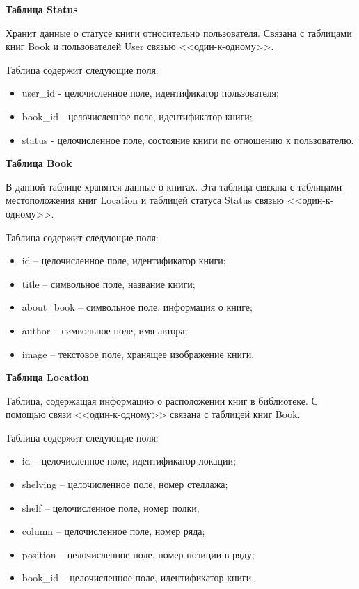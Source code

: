 \hfill \break

{\bf Таблица Status}

Хранит данные о статусе книги относительно пользователя. Связана с таблицами книг Book и пользователей User связью <<один-к-одному>>.

Таблица содержит следующие поля:
\begin{itemize}
	\item user\_id - целочисленное поле, идентификатор пользователя;
	\item book\_id - целочисленное поле, идентификатор книги;
	\item status - целочисленное поле, состояние книги по отношению к пользователю.
\end{itemize}

\hfill \break

{\bf Таблица Book}

В данной таблице хранятся данные о книгах. Эта таблица связана с таблицами местоположения книг Location и таблицей статуса Status связью <<один-к-одному>>.

Таблица содержит следующие поля:
\begin{itemize}
	\item id – целочисленное поле, идентификатор книги;
	\item title – символьное поле, название книги;
	\item about\_book – символьное поле, информация о книге;
	\item author – символьное поле, имя автора;
	\item image – текстовое поле, хранящее изображение книги.
\end{itemize}

\hfill \break

{\bf Таблица Location}

Таблица, содержащая информацию о расположении книг в библиотеке. С помощью связи <<один-к-одному>> связана с таблицей книг Book.

Таблица содержит следующие поля:
\begin{itemize}
	\item id – целочисленное поле, идентификатор локации;
	\item shelving – целочисленное поле, номер стеллажа;
	\item shelf – целочисленное поле, номер полки;
	\item column – целочисленное поле, номер ряда;
	\item position – целочисленное поле, номер позиции в ряду;
	\item book\_id – целочисленное поле, идентификатор книги.
\end{itemize}


